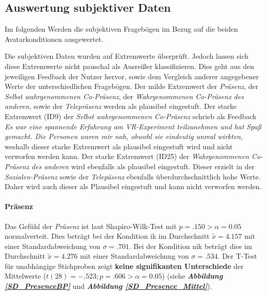 \documentclass[a4paper,11pt]{article}%
\renewcommand{\\}{\vspace*{0.5\baselineskip} \newline}
\begin{document}

\newpage
\subsection{Auswertung subjektiver Daten}
Im folgenden Werden die subjektiven Fragebögen im Bezug auf die beiden Avatarkonditionen ausgewertet.

Die subjektiven Daten wurden auf Extremwerte überprüft. Jedoch lassen sich diese Extremwerte nicht pauschal als Ausreißer klassifizieren. Dies geht aus den jeweiligen Feedback der Nutzer hervor, sowie dem Vergleich anderer angegebener Werte der unterschiedlichen Fragebögen. Der milde Extremwert der \textit{Präsenz}, der \textit{Selbst wahrgenommenen Co-Präsenz}, der \textit{Wahrgenommenen Co-Präsenz des anderen}, sowie der \textit{Telepräsenz} werden als plausibel eingestuft.
Der starke Extremwert (ID9) der \textit{Selbst wahrgenommenen Co-Präsenz} schrieb als Feedback \glqq{}\textit{Es war eine spannende Erfahrung am VR-Experiment teilzunehmen und hat Spaß gemacht. Die Personen waren mir nah, obwohl sie eindeutig unreal wirkten}\dq{}, weshalb dieser starke Extremwert als plausibel eingestuft wird und nicht verworfen werden kann.
Der starke Extremwert (ID25) der \textit{Wahrgenommenen Co-Präsenz des anderen} wird ebenfalls als plausibel eingestuft. Dieser erzielt in der \textit{Sozialen-Präsenz} sowie der \textit{Telepäsenz} ebenfalls überdurchschnittlich hohe Werte. Daher wird auch dieser als Plausibel eingestuft und kann nicht verworfen werden.

\paragraph{Präsenz}
Das Gefühl der \textit{Präsenz} ist laut Shapiro-Wilk-Test mit $p = .150 > \alpha = 0.05$ normalverteit. 
Dies beträgt bei der Kondition \ac{ik} im Durchschnitt $\tilde x = 4.157$ mit einer Standardabweichung von $\sigma = .701$.
Bei der Kondition \ac{nik} beträgt dies im Durchschnitt $\tilde x = 4.276$ mit einer Standardabweichung von $\sigma = .534$.
Der T-Test für unabhängige Stichproben zeigt \textbf{keine signifikanten Unterschiede} der Mittelwerte ($t(28) = -.523; p = .606 > \alpha = 0.05$) (siehe \textbf{\textit{Abbildung \ref{SD_PresenceBP}}} und \textbf{\textit{Abbildung \ref{SD_Presence_Mittel}}}).
\end{document}
